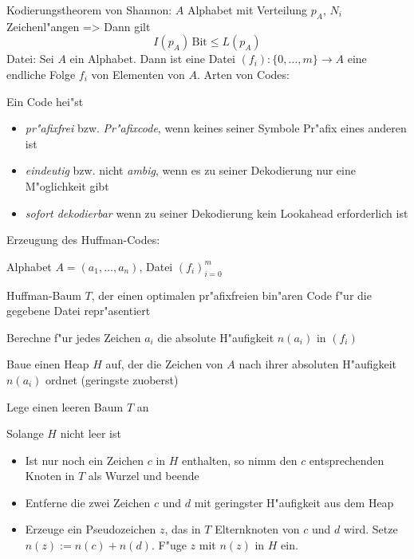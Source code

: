 \theorem Kodierungstheorem von Shannon:
  $A$ Alphabet mit Verteilung $p_A$, $N_i$ Zeichenl"angen
  =>
{
  Dann gilt
  \[
    I(p_A)\,\mathrm{Bit} \le L(p_A)
  \]
}
 Datei:{
  Sei $A$ ein Alphabet. Dann ist eine Datei $(f_i):\{0,\ldots,m\}\to A$ eine 
  endliche Folge $f_i$ von Elementen von $A$.
}
 Arten von Codes:{
  Ein Code hei"st
  \begin{itemize}
    \item \textit{pr"afixfrei} bzw. \textit{Pr"afixcode}, wenn keines 
      seiner Symbole Pr"afix eines anderen ist
    \item \textit{eindeutig} bzw. nicht \textit{ambig}, wenn es zu seiner 
      Dekodierung nur eine M"oglichkeit gibt
    \item \textit{sofort dekodierbar} wenn zu seiner Dekodierung kein Lookahead
      erforderlich ist
  \end{itemize}
}
\algorithm Erzeugung des Huffman-Codes:{
  \given Alphabet $A=(a_1,\ldots,a_n)$, Datei $(f_i)_{i=0}^m$
  
  \aim Huffman-Baum $T$, der einen optimalen pr"afixfreien bin"aren 
    Code f"ur die gegebene Datei repr"asentiert
    
  \begin{proc}
    \item Berechne f"ur jedes Zeichen $a_i$ die absolute H"aufigkeit $n(a_i)$
      in $(f_i)$
    \item Baue einen Heap $H$ auf, der die Zeichen von $A$ nach ihrer
      absoluten H"aufigkeit $n(a_i)$ ordnet (geringste zuoberst)
    \item Lege einen leeren Baum $T$ an
    \item Solange $H$ nicht leer ist
      \begin{itemize}
        \item Ist nur noch ein Zeichen $c$ in $H$ enthalten, so nimm 
          den $c$ entsprechenden Knoten in $T$ als Wurzel und beende
        \item Entferne die zwei Zeichen $c$ und $d$ mit geringster H"aufigkeit
          aus dem Heap
        \item Erzeuge ein Pseudozeichen $z$, das in $T$ Elternknoten von $c$
          und $d$ wird. Setze $n(z):=n(c)+n(d)$. F"uge $z$ mit $n(z)$ in
          $H$ ein.
      \end{itemize}
  \end{proc}
}
